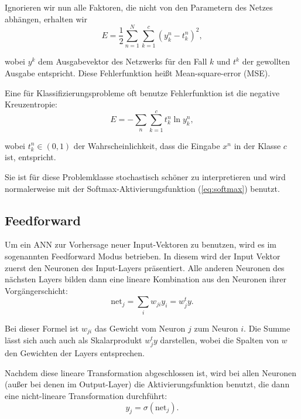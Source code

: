 Ignorieren wir nun alle Faktoren, die nicht von den Parametern des Netzes abhängen, erhalten wir 
\begin{equation}
\label{eq:MSE}
E = \frac{1}{2} \sum_{n=1}^N \sum_{k=1}^c \left( y_k^n - t_k^n \right)^2,
\end{equation}

wobei $y^k$ dem Ausgabevektor des Netzwerks für den Fall $k$ und $t^k$ der gewollten Ausgabe entspricht.
Diese Fehlerfunktion heißt Mean-square-error (MSE)\cite{bishop1995neural}.

Eine für Klassifizierungsprobleme oft benutze Fehlerfunktion ist die negative Kreuzentropie:
\begin{equation}
\label{eq:crossEntropy}
    E = -\sum_{n} \sum_{k=1}^c t_k^n \ln y_k^n ,
\end{equation}

wobei $t_k^n \in (0,1)$ der Wahrscheinlichkeit, dass die Eingabe $x^n$ in der Klasse $c$ ist, entspricht. 

Sie ist für diese Problemklasse stochastisch schöner zu interpretieren und wird normalerweise mit der Softmax-Aktivierungsfunktion (\ref{eq:softmax}) benutzt\cite{bishop1995neural}.

\subsection{Feedforward}
Um ein ANN zur Vorhersage neuer Input-Vektoren zu benutzen, wird es im sogenannten Feedforward Modus betrieben. In diesem wird der Input Vektor zuerst den Neuronen des Input-Layers präsentiert. Alle anderen Neuronen des nächsten Layers bilden dann eine lineare Kombination aus den Neuronen ihrer Vorgängerschicht: 
\begin{equation}
\label{eq:feedforward1}
\text{net}_j = \sum_{i} w_{ji} y_i = w_j^t y.
\end{equation}

Bei dieser Formel ist $w_{ji}$ das Gewicht vom Neuron $j$ zum Neuron $i$. Die Summe lässt sich auch auch als Skalarprodukt $w_j^t y$ darstellen, wobei die Spalten von $w$ den Gewichten der Layers entsprechen. %

Nachdem diese lineare Transformation abgeschlossen ist, wird bei allen Neuronen (außer bei denen im Output-Layer) die Aktivierungsfunktion benutzt, die dann eine nicht-lineare Transformation durchführt: 
\begin{equation}
\label{eq:feedforward2}
y_j = \sigma (\text{net}_j).
\end{equation}

